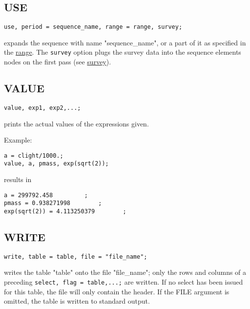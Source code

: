 \subsection{USE}
\label{subsec:general_use}
\begin{verbatim}
use, period = sequence_name, range = range, survey;
\end{verbatim} 
expands the sequence with name "sequence\_name", or a part of it as specified
in the \href{../Introduction/ranges.html#range}{range}. The
\texttt{survey} option plugs the survey data into the sequence elements
nodes on the first pass (see \href{../survey/survey.html}{survey}).  


\subsection{VALUE}
\begin{verbatim}
value, exp1, exp2,...;
\end{verbatim} 
prints the actual values of the expressions given. 

Example: 
\begin{verbatim}
a = clight/1000.;
value, a, pmass, exp(sqrt(2));
\end{verbatim} 
results in 
\begin{verbatim}
a = 299792.458         ;
pmass = 0.938271998        ;
exp(sqrt(2)) = 4.113250379        ;
\end{verbatim}


\subsection{WRITE}
\label{subsec:general_write}
\begin{verbatim}
write, table = table, file = "file_name";
\end{verbatim} 
writes the table "table" onto the file "file\_name"; only the rows and
columns of a preceding \verb+select, flag = table,...;+ are written. If no select
has been issued for this table, the file will only contain the
header. If the FILE argument is omitted, the table is written to
standard output.  


